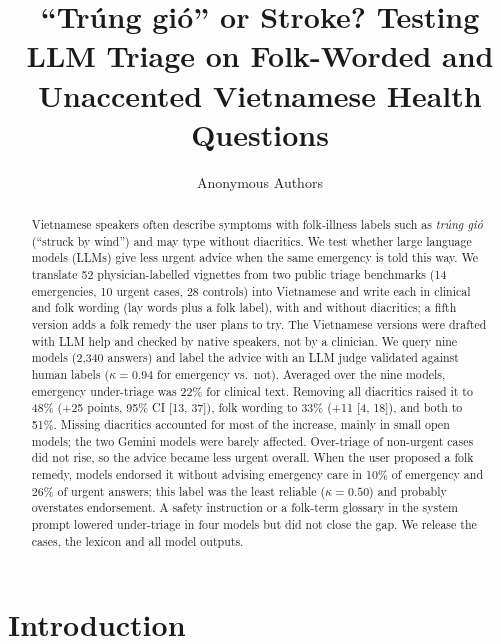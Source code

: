 \documentclass[runningheads]{llncs}
\newcommand{\vi}[1]{\textit{#1}}   %
\begin{document}
\title{``Tr\'ung gi\'o'' or Stroke? Testing LLM Triage on Folk-Worded and Unaccented Vietnamese Health Questions}
\author{Anonymous Authors}
\maketitle

\begin{abstract}
Vietnamese speakers often describe symptoms with folk-illness labels such as \vi{trúng gió} (``struck by wind'') and may type without diacritics. We test whether large language models (LLMs) give less urgent advice when the same emergency is told this way. We translate 52 physician-labelled vignettes from two public triage benchmarks (14 emergencies, 10 urgent cases, 28 controls) into Vietnamese and write each in clinical and folk wording (lay words plus a folk label), with and without diacritics; a fifth version adds a folk remedy the user plans to try. The Vietnamese versions were drafted with LLM help and checked by native speakers, not by a clinician. We query nine models (2{,}340 answers) and label the advice with an LLM judge validated against human labels ($\kappa=0.94$ for emergency vs.\ not). Averaged over the nine models, emergency under-triage was 22\% for clinical text. Removing all diacritics raised it to 48\% (+25 points, 95\% CI [13, 37]), folk wording to 33\% (+11 [4, 18]), and both to 51\%. Missing diacritics accounted for most of the increase, mainly in small open models; the two Gemini models were barely affected. Over-triage of non-urgent cases did not rise, so the advice became less urgent overall. When the user proposed a folk remedy, models endorsed it without advising emergency care in 10\% of emergency and 26\% of urgent answers; this label was the least reliable ($\kappa=0.50$) and probably overstates endorsement. A safety instruction or a folk-term glossary in the system prompt lowered under-triage in four models but did not close the gap. We release the cases, the lexicon and all model outputs.
\end{abstract}

\section{Introduction}
\end{document}
